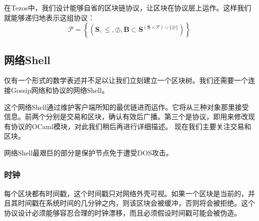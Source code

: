 \documentclass[letterpaper]{article}
\begin{document}
在Tezos中，我们设计能够自省的区块链协议，让区块在协议层上运作。这样我们就能够递归地表示这组协议：
$$\mathcal{P} = \left\{\left(\mathbf{S},\leq,\oslash,\mathbf{B} \subset
\mathbf{S}^{(\mathbf{S} \times \mathcal{P})\cup \{\oslash\}} \right)\right\}$$

\subsection{网络Shell}
仅有一个形式的数学表述并不足以让我们立刻建立一个区块树。我们还需要一个连接Gossip网络和协议的网络Shell。

这个网络Shell通过维护客户端所知的最优链进而运作。它将从三种对象那里接受信息。前两个分别是交易和区块，确认有效后广播。第三个是协议，即用来修改现有协议的OCaml模块，对此我们稍后再进行详细描述。
现在我们主要关注交易和区块。

网络Shell最艰巨的部分是保护节点免于遭受DOS攻击。

\subsubsection{时钟}
每个区块都有时间戳，这个时间戳只对网络外壳可视。如果一个区块是当前的，并且其时间戳在系统时间的几分钟之内，则该区块会被缓冲，否则将会被拒绝。这个协议设计必须能够容忍合理的时钟漂移，而且必须假设时间戳可能会被伪造。
\end{document}
